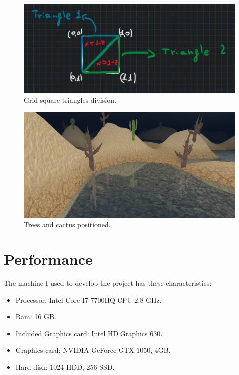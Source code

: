 \begin{figure}[hbt!]
	\centering
	\includegraphics[width= 1
	\textwidth]{images/object2.jpg}
	\caption{Grid square triangles division.}
\end{figure}

\begin{figure}[hbt!]
	\centering
	\includegraphics[width= 1
	\textwidth]{images/object3.png}
	\caption{Trees and cactus positioned.}
\end{figure}

\newpage

\section{Performance}
The machine I used to develop the project has these characteristics:

\begin{itemize}
	\item Processor: Intel Core I7-7700HQ CPU 2.8 GHz.
	\item Ram: 16 GB.
	\item Included Graphics card: Intel HD Graphics 630.
	\item Graphics card: NVIDIA GeForce GTX 1050, 4GB.
	\item Hard disk: 1024 HDD, 256 SSD. 
\end{itemize}

